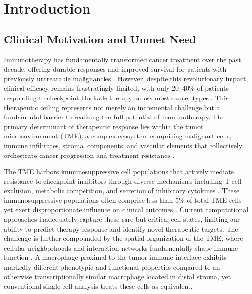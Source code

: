 \documentclass{article}
\begin{document}

\section{Introduction}

\subsection{Clinical Motivation and Unmet Need}

Immunotherapy has fundamentally transformed cancer treatment over the past decade, offering durable responses and improved survival for patients with previously untreatable malignancies \citep{sharma2015future}. However, despite this revolutionary impact, clinical efficacy remains frustratingly limited, with only 20--40\% of patients responding to checkpoint blockade therapy across most cancer types \citep{haslam2019estimation}. This therapeutic ceiling represents not merely an incremental challenge but a fundamental barrier to realizing the full potential of immunotherapy. The primary determinant of therapeutic response lies within the tumor microenvironment (TME), a complex ecosystem comprising malignant cells, immune infiltrates, stromal components, and vascular elements that collectively orchestrate cancer progression and treatment resistance \citep{hinshaw2019tumor}.

The TME harbors immunosuppressive cell populations that actively mediate resistance to checkpoint inhibitors through diverse mechanisms including T cell exclusion, metabolic competition, and secretion of inhibitory cytokines \citep{cassetta2018targeting}. These immunosuppressive populations often comprise less than 5\% of total TME cells yet exert disproportionate influence on clinical outcomes \citep{murray2014macrophage}. Current computational approaches inadequately capture these rare but critical cell states, limiting our ability to predict therapy response and identify novel therapeutic targets. The challenge is further compounded by the spatial organization of the TME, where cellular neighborhoods and interaction networks fundamentally shape immune function \citep{binnewies2018understanding}. A macrophage proximal to the tumor-immune interface exhibits markedly different phenotypic and functional properties compared to an otherwise transcriptionally similar macrophage located in distal stroma, yet conventional single-cell analysis treats these cells as equivalent.
\end{document}
